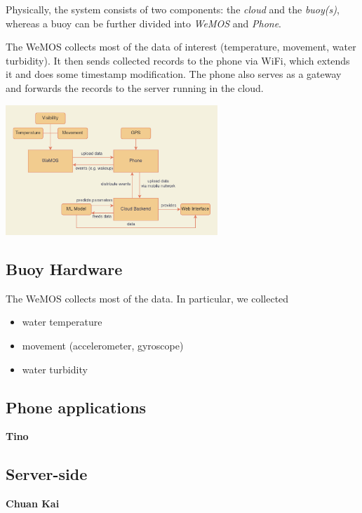 \documentclass{article}
\begin{document}
\begin{multicols}{2}

Physically, the system consists of two components: the \textit{cloud} and the \textit{buoy(s)}, whereas a buoy can be further divided into \textit{WeMOS} and \textit{Phone}. 

The WeMOS collects most of the data of interest (temperature, movement, water turbidity). It then sends collected records to the phone via WiFi, which extends it and does some timestamp modification. The phone also serves as a gateway and forwards the records to the server running in the cloud.

\includegraphics[width=8cm]{report/resources/architecture.png}

\end{multicols}

\subsection{Buoy Hardware}

The WeMOS collects most of the data. In particular, we collected

\begin{itemize}
    \item water temperature
    \item movement (accelerometer, gyroscope)
    \item water turbidity
\end{itemize}

\subsection{Phone applications}

\textbf{Tino}

\subsection{Server-side}

\textbf{Chuan Kai}
\end{document}
